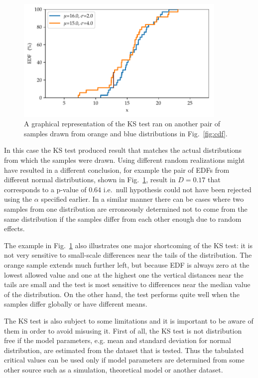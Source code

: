 \documentclass[english, oneside]{HYgradu}
\begin{document}
\begin{figure}
   \centering
   \includegraphics[width=0.9\textwidth]{kuvat/kstest-error.pdf}
   \caption{A graphical representation of the KS test ran on another pair of samples drawn from orange and blue distributions in Fig.\ \ref{fig:cdf}.}
   \label{fig:ks-error} 
\end{figure}

In this case the KS test produced result that matches the actual distributions from which the samples were drawn. Using different random realizations might have resulted in a different conclusion, for example the pair of EDFs from different normal distributions, shown in Fig.\ \ref{fig:ks-error}, result in $D=0.17$ that corresponds to a p-value of $0.64$ i.e.\ null hypothesis could not have been rejected using the $\alpha$ specified earlier. In a similar manner there can be cases where two samples from one distribution are erroneously determined not to come from the same distribution if the samples differ from each other enough due to random effects.

The example in Fig.~\ref{fig:ks-error} also illustrates one major shortcoming of the KS test: it is not very sensitive to small-scale differences near the tails of the distribution. The orange sample extends much further left, but because EDF is always zero at the lowest allowed value and one at the highest one the vertical distances near the tails are small and the test is most sensitive to differences near the median value of the distribution. On the other hand, the test performs quite well when the samples differ globally or have different means. \citep{feigelson2012modern}

The KS test is also subject to some limitations and it is important to be aware of them in order to avoid misusing it. First of all, the KS test is not distribution free if the model parameters, e.g. mean and standard deviation for normal distribution, are estimated from the dataset that is tested. Thus the tabulated critical values can be used only if model parameters are determined from some other source such as a simulation, theoretical model or another dataset.
\end{document}
